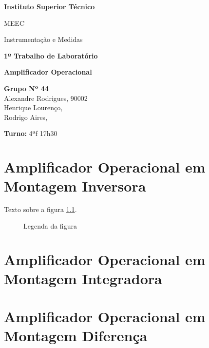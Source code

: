 \documentclass[a4paper, 2pt]{report}
\begin{document}
    

\begin{titlepage}
    \begin{center}
        \vspace*{3cm}
 
        \LARGE
        \textbf{Instituto Superior Técnico}
        \vskip 0.4cm
 
        \Large{MEEC}
        \vskip 0.2cm

        \Large{Instrumentação e Medidas}
        \vskip 3cm
        

 
        \Huge{\textbf{1º Trabalho de Laboratório}}
        \vskip 0.5cm

        \huge{\textbf{Amplificador Operacional}}
        \vskip 0.5cm

 
        \vfill
 
        \large
        \textbf{Grupo Nº 44}\\
        \vspace{0.3cm}
        Alexandre Rodrigues, 90002\\
        Henrique Lourenço, \\
        Rodrigo Aires, \\
        \vspace{1cm}

        \textbf{Turno:} 4ªf 17h30

    \end{center}
\end{titlepage}

\chapter{Amplificador Operacional em Montagem Inversora}

\par Texto sobre a figura \ref{figura_exemplo}.

\begin{figure}[H]
    \centering
    \caption{Legenda da figura}
    \label{figura_exemplo}
\end{figure}

\chapter{Amplificador Operacional em Montagem Integradora}



\chapter{Amplificador Operacional em Montagem Diferença}
\end{document}
